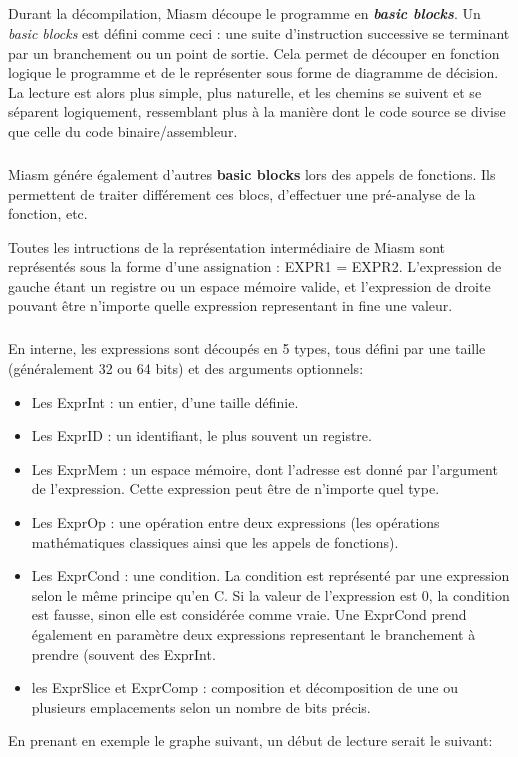 \subparagraph{}
Durant la décompilation, Miasm découpe le programme en \textbf{\textit{basic blocks}}. Un \textit{basic blocks} est défini comme ceci :
une suite d'instruction successive se terminant par un branchement ou un point de sortie. Cela permet de découper en fonction logique
le programme et de le représenter sous forme de diagramme de décision. La lecture est alors plus simple, plus naturelle, et les chemins se suivent et se
séparent logiquement, ressemblant plus à la manière dont le code source se divise que celle du code binaire/assembleur.
\subparagraph{}
Miasm génére également d'autres \textbf{basic blocks} lors des appels de fonctions. Ils permettent de traiter différement ces blocs, d'effectuer une pré-analyse
de la fonction, etc.

Toutes les intructions de la représentation intermédiaire de Miasm sont représentés sous la forme d'une assignation : EXPR1 = EXPR2.
L'expression de gauche étant un registre ou un espace mémoire valide, et l'expression de droite pouvant être n'importe quelle expression
representant in fine une valeur.
\subparagraph{}
En interne, les expressions sont découpés en 5 types, tous défini par une taille (généralement 32 ou 64 bits) et des arguments optionnels:
\begin{itemize}
    \item Les ExprInt : un entier, d'une taille définie.
    \item Les ExprID : un identifiant, le plus souvent un registre.
    \item Les ExprMem : un espace mémoire, dont l'adresse est donné par l'argument de l'expression. Cette expression peut être de n'importe quel type.
    \item Les ExprOp : une opération entre deux expressions (les opérations mathématiques classiques ainsi que les appels de fonctions).
    \item Les ExprCond : une condition. La condition est représenté par une expression selon le même principe qu'en C. Si la valeur de l'expression est 0, la condition est fausse, sinon elle est considérée comme vraie. Une ExprCond prend également en paramètre deux expressions representant le branchement à prendre (souvent des ExprInt.
    \item les ExprSlice et ExprComp : composition et décomposition de une ou plusieurs emplacements selon un nombre de bits précis.
\end{itemize}
En prenant en exemple le graphe suivant, un début de lecture serait le suivant:
